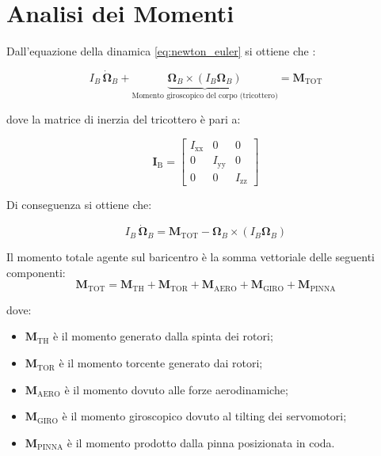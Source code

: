 \clearpage

\section{Analisi dei Momenti}
Dall'equazione della dinamica \ref{eq:newton_euler} si ottiene che :
	  
\begin{equation}
I_B \, \dot{\bm{\Omega}}_B +
\underbrace{\bm{\Omega}_B \times (I_B \bm{\Omega}_B)}_{\text{Momento giroscopico del corpo (tricottero)}}
= \bm{M}_{\text{TOT}}
\label{eq:eq_momenti}
\end{equation}

\vspace{0.3cm}
dove la matrice di inerzia del tricottero è pari a:

\begin{equation}
    \bm{I}_{\text{B}} =
    \begin{bmatrix}
        I_{\text{xx}} & 0 & 0 \\
        0 & I_{\text{yy}} & 0 \\
        0 & 0 & I_{\text{zz}}
    \end{bmatrix}
\end{equation}

\vspace{0.3cm}
Di conseguenza si ottiene che:

\begin{equation}
    I_B \, \dot{\bm{\Omega}}_B =
    \bm{M}_{\text{TOT}} -
    \bm{\Omega}_B \times (I_B \bm{\Omega}_B)
    \label{eq:eq_momenti_esplicita}
\end{equation}


Il momento totale agente sul baricentro è la somma vettoriale delle seguenti componenti:
\begin{equation}
    \bm{M}_{\text{TOT}} = \bm{M}_{\text{TH}} + \bm{M}_{\text{TOR}} + \bm{M}_{\text{AERO}} + \bm{M}_{\text{GIRO}} + \bm{M}_{\text{PINNA}}
    \label{eq:M_tot}
\end{equation}

dove:
\begin{itemize}
    \item $\bm{M}_{\text{TH}}$ è il momento generato dalla spinta dei rotori;
    \item $\bm{M}_{\text{TOR}}$ è il momento torcente generato dai rotori;
    \item $\bm{M}_{\text{AERO}}$ è il momento dovuto alle forze aerodinamiche;
    \item $\bm{M}_{\text{GIRO}}$ è il momento giroscopico dovuto al tilting dei servomotori;
    \item $\bm{M}_{\text{PINNA}}$ è il momento prodotto dalla pinna posizionata in coda.
\end{itemize}

